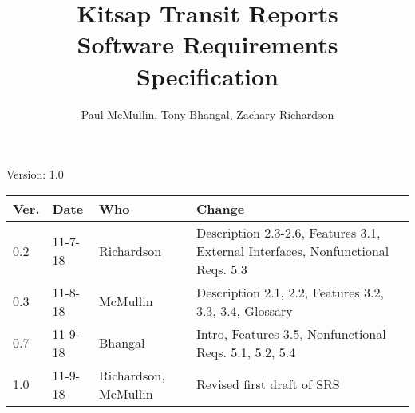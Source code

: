\documentclass[letterpaper,12pt]{article}
\title{Kitsap Transit Reports\\Software Requirements Specification}
\author{Paul McMullin, Tony Bhangal, Zachary Richardson}
\begin{document}
\maketitle

\begin{center}
  Version: 1.0
\end{center}

\vfill
\begin{tabularx}{\linewidth}{|l|l|l|X|l|}\hline
Ver. & Date & Who & Change \\\hline
0.2     &  11-7-18    &  Richardson   &   Description 2.3-2.6, Features 3.1, External Interfaces, Nonfunctional Reqs. 5.3  \\\hline
0.3     &  11-8-18    &  McMullin   &  Description 2.1, 2.2, Features 3.2, 3.3, 3.4, Glossary \\\hline
0.7  &   11-9-18   &  Bhangal  & Intro, Features 3.5, Nonfunctional Reqs. 5.1, 5.2, 5.4     \\\hline
1.0  &   11-9-18   &  Richardson, McMullin   & Revised first draft of SRS    \\\hline

\end{tabularx}

\newpage







\appendix 

%
%
\end{document}
